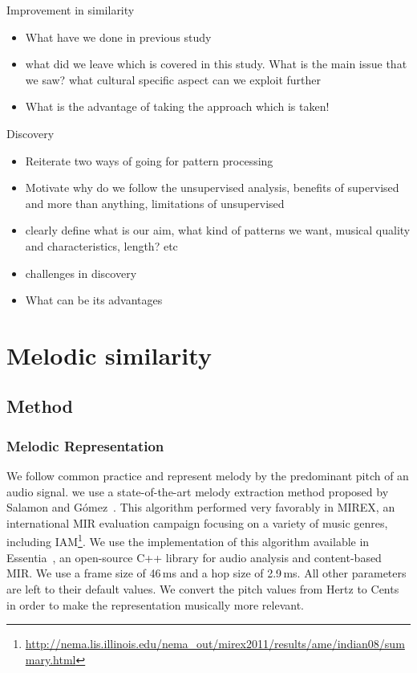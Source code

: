 Improvement in similarity
\begin{itemize}
	\item What have we done in previous study
	\item what did we leave which is covered in this study. What is the main issue that we saw? what cultural specific aspect can we exploit further
	\item What is the advantage of taking the approach which is taken! 
\end{itemize}

Discovery
\begin{itemize}
	\item Reiterate two ways of going for pattern processing
	\item Motivate why do we follow the unsupervised analysis, benefits of supervised and more than anything, limitations of unsupervised
	\item clearly define what is our aim, what kind of patterns we want, musical quality and characteristics, length? etc
	\item challenges in discovery
	\item What can be its advantages
\end{itemize}





\section{Melodic similarity}

\subsection{Method}
\subsubsection{Melodic Representation}

We follow common practice and represent melody by the predominant pitch of an audio signal.  we use a state-of-the-art melody extraction method proposed by Salamon and G\'omez~\cite{Salamon2012}. This algorithm performed very favorably in MIREX, an international MIR evaluation campaign focusing on a variety of music genres, including IAM\footnote{\url{http://nema.lis.illinois.edu/nema_out/mirex2011/results/ame/indian08/summary.html}}. We use the implementation of this algorithm available in Essentia~\cite{essentia}, an open-source C++ library for audio analysis and content-based MIR. We use a frame size of 46\,ms and a hop size of 2.9\,ms. All other parameters are left to their default values.  We convert the pitch values from Hertz to Cents in order to make the representation musically more relevant.

